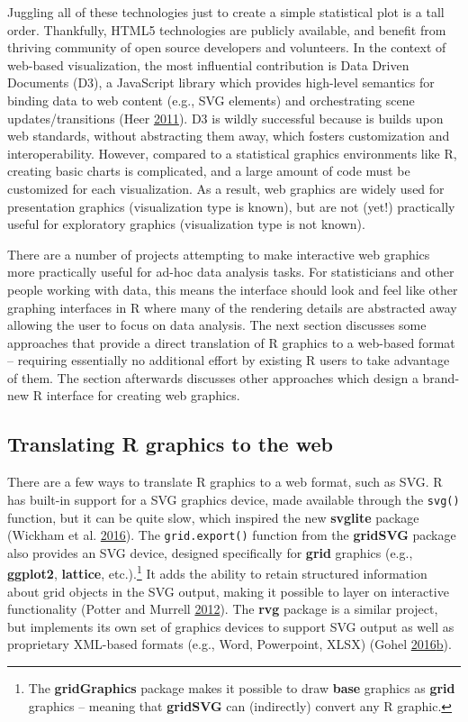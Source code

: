 \documentclass[12pt,]{isuthesis}
\let\rmarkdownfootnote\footnote%
\def\footnote{\protect\rmarkdownfootnote}
\begin{document}
Juggling all of these technologies just to create a simple statistical
plot is a tall order. Thankfully, HTML5 technologies are publicly
available, and benefit from thriving community of open source developers
and volunteers. In the context of web-based visualization, the most
influential contribution is Data Driven Documents (D3), a JavaScript
library which provides high-level semantics for binding data to web
content (e.g., SVG elements) and orchestrating scene updates/transitions
(Heer \protect\hyperlink{ref-Bostock:2011}{2011}). D3 is wildly
successful because is builds upon web standards, without abstracting
them away, which fosters customization and interoperability. However,
compared to a statistical graphics environments like R, creating basic
charts is complicated, and a large amount of code must be customized for
each visualization. As a result, web graphics are widely used for
presentation graphics (visualization type is known), but are not (yet!)
practically useful for exploratory graphics (visualization type is not
known).

There are a number of projects attempting to make interactive web
graphics more practically useful for ad-hoc data analysis tasks. For
statisticians and other people working with data, this means the
interface should look and feel like other graphing interfaces in R where
many of the rendering details are abstracted away allowing the user to
focus on data analysis. The next section discusses some approaches that
provide a direct translation of R graphics to a web-based format --
requiring essentially no additional effort by existing R users to take
advantage of them. The section afterwards discusses other approaches
which design a brand-new R interface for creating web graphics.

\subsection{Translating R graphics to the
web}\label{translating-r-graphics-to-the-web}

There are a few ways to translate R graphics to a web format, such as
SVG. R has built-in support for a SVG graphics device, made available
through the \texttt{svg()} function, but it can be quite slow, which
inspired the new \textbf{svglite} package (Wickham et al.
\protect\hyperlink{ref-svglite}{2016}). The \texttt{grid.export()}
function from the \textbf{gridSVG} package also provides an SVG device,
designed specifically for \textbf{grid} graphics (e.g.,
\textbf{ggplot2}, \textbf{lattice}, etc.).\footnote{The
  \textbf{gridGraphics} package makes it possible to draw \textbf{base}
  graphics as \textbf{grid} graphics -- meaning that \textbf{gridSVG}
  can (indirectly) convert any R graphic.} It adds the ability to retain
structured information about grid objects in the SVG output, making it
possible to layer on interactive functionality (Potter and Murrell
\protect\hyperlink{ref-gridSVGreport}{2012}). The \textbf{rvg} package
is a similar project, but implements its own set of graphics devices to
support SVG output as well as proprietary XML-based formats (e.g., Word,
Powerpoint, XLSX) (Gohel
\protect\hyperlink{ref-rvg}{2016}\protect\hyperlink{ref-rvg}{b}).
\end{document}
